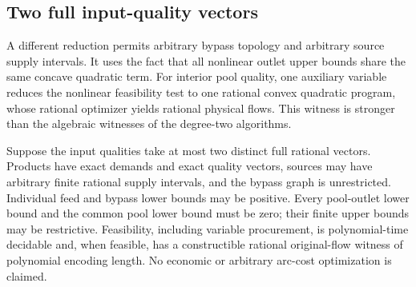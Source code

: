 \subsection{Two full input-quality vectors}\label{s5:two-vectors}

A different reduction permits arbitrary bypass topology and arbitrary
source supply intervals. It uses the fact that all nonlinear outlet
upper bounds share the same concave quadratic term. For interior pool quality, one
auxiliary variable reduces the nonlinear feasibility test to one rational
convex quadratic program, whose rational optimizer yields rational
physical flows. This witness is stronger than the algebraic
witnesses of the degree-two algorithms.

\begin{theorem}
\label{s5:two-vector-theorem}
Suppose the input qualities take at most two distinct full rational
vectors. Products have exact demands and exact quality vectors, sources
may have arbitrary finite rational supply intervals, and the bypass
graph is unrestricted. Individual feed and bypass lower bounds may be
positive. Every pool-outlet lower bound and the common pool lower bound
must be zero; their finite upper bounds may be restrictive. Feasibility,
including variable procurement,
is polynomial-time decidable and, when feasible, has a constructible
rational original-flow witness of polynomial encoding length. No
economic or arbitrary arc-cost optimization is claimed.
\end{theorem}
